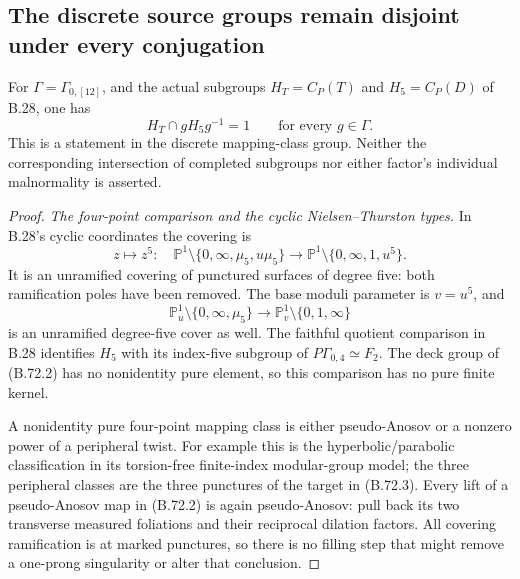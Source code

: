 \subsection*{The discrete source groups remain disjoint under every conjugation}

For $\Gamma=\Gamma_{0,[12]}$, and the actual subgroups
$H_T=C_P(T)$ and $H_5=C_P(D)$ of B.28, one has
\[
                  H_T\cap gH_5g^{-1}=1
                       \qquad\text{for every }g\in\Gamma.
                                                               \tag{B.72.1}
\]
This is a statement in the discrete mapping-class group.
Neither the corresponding intersection of completed subgroups
nor either factor's individual malnormality is asserted.

\begin{proof}
\emph{The four-point comparison and the cyclic Nielsen--Thurston types.}
In B.28's cyclic coordinates the covering is
\[
 z\longmapsto z^5:\quad
 \mathbb P^1\setminus\{0,\infty,\mu_5,u\mu_5\}
 \longrightarrow
 \mathbb P^1\setminus\{0,\infty,1,u^5\}.
                                                               \tag{B.72.2}
\]
It is an unramified covering of punctured surfaces of degree five:
both ramification poles have been removed.
The base moduli parameter is $v=u^5$, and
\[
 \mathbb P^1_u\setminus\{0,\infty,\mu_5\}
      \longrightarrow\mathbb P^1_v\setminus\{0,1,\infty\}
                                                               \tag{B.72.3}
\]
is an unramified degree-five cover as well.
The faithful quotient comparison in B.28 identifies $H_5$
with its index-five subgroup of $P\Gamma_{0,4}\simeq F_2$.
The deck group of (B.72.2) has no nonidentity pure element,
so this comparison has no pure finite kernel.

A nonidentity pure four-point mapping class is either
pseudo-Anosov or a nonzero power of a peripheral twist.
For example this is the hyperbolic/parabolic classification
in its torsion-free finite-index modular-group model;
the three peripheral classes are the three punctures of
the target in (B.72.3).
Every lift of a pseudo-Anosov map in (B.72.2) is again
pseudo-Anosov: pull back its two transverse measured
foliations and their reciprocal dilation factors.
All covering ramification is at marked punctures, so
there is no filling step that might remove a one-prong
singularity or alter that conclusion.


\end{proof}

